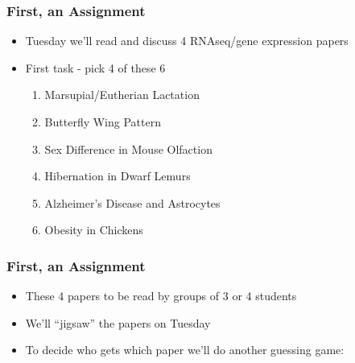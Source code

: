 \documentclass[14pt]{beamer}
\begin{document}
\begin{frame}
\frametitle{First, an Assignment}
\begin{itemize}
	\item<+-> Tuesday we'll read and discuss 4 RNAseq/gene expression papers
	\item<+-> First task - pick 4 of these 6
	\begin{enumerate}
		\item<+-> Marsupial/Eutherian Lactation
		\item<+-> Butterfly Wing Pattern
		\item<+-> Sex Difference in Mouse Olfaction
		\item<+-> Hibernation in Dwarf Lemurs
		\item<+-> Alzheimer's Disease and Astrocytes
		\item<+-> Obesity in Chickens
	\end{enumerate}
\end{itemize}
\end{frame}

\begin{frame}
\frametitle{First, an Assignment}
\begin{itemize}
	\item<+-> These 4 papers to be read by groups of 3 or 4 students
	\item<+-> We'll ``jigsaw'' the papers on Tuesday
	\item<+-> To decide who gets which paper we'll do another guessing game:
\end{itemize}
\end{frame}

\end{document}
